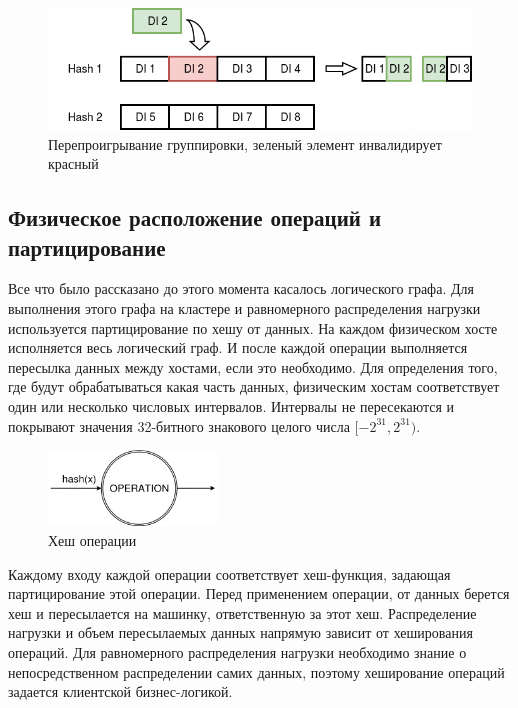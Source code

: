 \documentclass[14pt]{matmex-diploma-custom}
\begin{document}
\begin{figure}
  \centering
	\includegraphics[width=1.0\textwidth]{pics/invalid.png}
	\caption{Перепроигрывание группировки, зеленый элемент инвалидирует красный}
\end{figure}

\subsection{Физическое расположение операций и партицирование}

Все что было рассказано до этого момента касалось логического графа. Для выполнения этого графа на кластере и равномерного распределения нагрузки используется партицирование по хешу от данных. На каждом физическом хосте исполняется весь логический граф. И после каждой операции выполняется пересылка данных между хостами, если это необходимо. Для определения того, где будут обрабатываться какая часть данных, физическим хостам соответствует один или несколько числовых интервалов. Интервалы не пересекаются и покрывают значения 32-битного знакового целого числа \([-2^{31}, 2^{31})\).

\begin{figure}
  \centering
	\includegraphics[width=0.4\textwidth]{pics/ophash.png}
	\caption{Хеш операции}
\end{figure}

Каждому входу каждой операции соответствует хеш-функция, задающая партицирование этой операции. Перед применением операции, от данных берется хеш и пересылается на машинку, ответственную за этот хеш. Распределение нагрузки и объем пересылаемых данных напрямую зависит от хеширования операций. Для равномерного распределения нагрузки необходимо знание о непосредственном распределении самих данных, поэтому хеширование операций задается клиентской бизнес-логикой.
\end{document}
